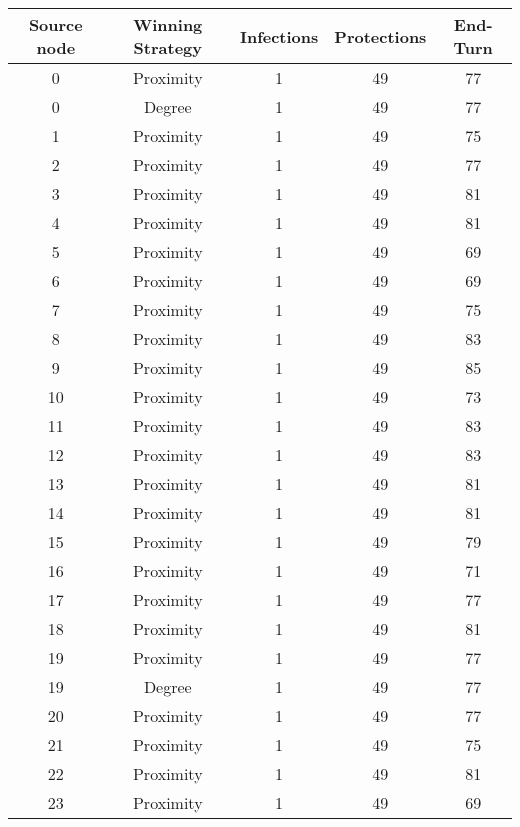 \documentclass[results.tex]{subfiles}
\begin{document}
\begin{center}
  \begin{tabular}{| c || c | c | c | c |}
    \hline
    {\bfseries Source node} & {\bfseries Winning Strategy} & {\bfseries Infections} & {\bfseries Protections} & {\bfseries End-Turn} \\  %
    \hline\hline
    0 & Proximity & 1 & 49 & 77 \\ 
    \hline
    0 & Degree & 1 & 49 & 77 \\ 
    \hline
    1 & Proximity & 1 & 49 & 75 \\ 
    \hline
    2 & Proximity & 1 & 49 & 77 \\ 
    \hline
    3 & Proximity & 1 & 49 & 81 \\ 
    \hline
    4 & Proximity & 1 & 49 & 81 \\ 
    \hline
    5 & Proximity & 1 & 49 & 69 \\ 
    \hline
    6 & Proximity & 1 & 49 & 69 \\ 
    \hline
    7 & Proximity & 1 & 49 & 75 \\ 
    \hline
    8 & Proximity & 1 & 49 & 83 \\ 
    \hline
    9 & Proximity & 1 & 49 & 85 \\ 
    \hline
    10 & Proximity & 1 & 49 & 73 \\ 
    \hline
    11 & Proximity & 1 & 49 & 83 \\ 
    \hline
    12 & Proximity & 1 & 49 & 83 \\ 
    \hline
    13 & Proximity & 1 & 49 & 81 \\ 
    \hline
    14 & Proximity & 1 & 49 & 81 \\ 
    \hline
    15 & Proximity & 1 & 49 & 79 \\ 
    \hline
    16 & Proximity & 1 & 49 & 71 \\ 
    \hline
    17 & Proximity & 1 & 49 & 77 \\ 
    \hline
    18 & Proximity & 1 & 49 & 81 \\ 
    \hline
    19 & Proximity & 1 & 49 & 77 \\ 
    \hline
    19 & Degree & 1 & 49 & 77 \\ 
    \hline
    20 & Proximity & 1 & 49 & 77 \\ 
    \hline
    21 & Proximity & 1 & 49 & 75 \\ 
    \hline
    22 & Proximity & 1 & 49 & 81 \\ 
    \hline
    23 & Proximity & 1 & 49 & 69 \\ 

\end{tabular}
\end{center}
\end{document}
